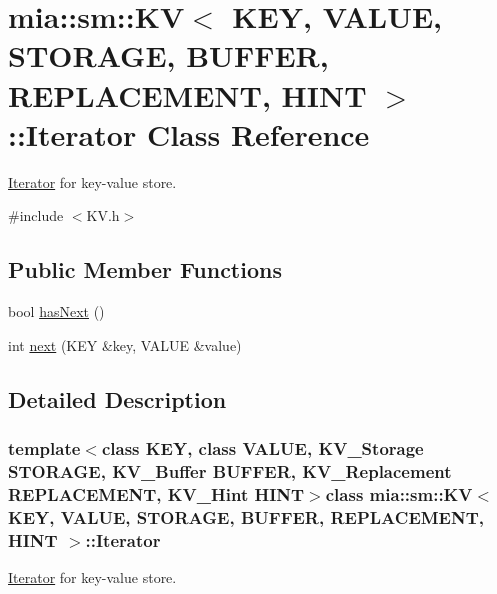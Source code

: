 \hypertarget{classmia_1_1sm_1_1_k_v_1_1_iterator}{\section{mia\-:\-:sm\-:\-:K\-V$<$ K\-E\-Y, V\-A\-L\-U\-E, S\-T\-O\-R\-A\-G\-E, B\-U\-F\-F\-E\-R, R\-E\-P\-L\-A\-C\-E\-M\-E\-N\-T, H\-I\-N\-T $>$\-:\-:Iterator Class Reference}
\label{classmia_1_1sm_1_1_k_v_1_1_iterator}
}


\hyperlink{classmia_1_1sm_1_1_k_v_1_1_iterator}{Iterator} for key-\/value store.  




{\ttfamily \#include $<$K\-V.\-h$>$}

\subsection*{Public Member Functions}
\begin{DoxyCompactItemize}
\item 
bool \hyperlink{classmia_1_1sm_1_1_k_v_1_1_iterator_aadd84a5628619a800298856fc78647c6}{has\-Next} ()
\item 
int \hyperlink{classmia_1_1sm_1_1_k_v_1_1_iterator_a8688cd904ec7f7f5b201470aaf183139}{next} (K\-E\-Y \&key, V\-A\-L\-U\-E \&value)
\end{DoxyCompactItemize}


\subsection{Detailed Description}
\subsubsection*{template$<$class K\-E\-Y, class V\-A\-L\-U\-E, K\-V\-\_\-\-Storage S\-T\-O\-R\-A\-G\-E, K\-V\-\_\-\-Buffer B\-U\-F\-F\-E\-R, K\-V\-\_\-\-Replacement R\-E\-P\-L\-A\-C\-E\-M\-E\-N\-T, K\-V\-\_\-\-Hint H\-I\-N\-T$>$class mia\-::sm\-::\-K\-V$<$ K\-E\-Y, V\-A\-L\-U\-E, S\-T\-O\-R\-A\-G\-E, B\-U\-F\-F\-E\-R, R\-E\-P\-L\-A\-C\-E\-M\-E\-N\-T, H\-I\-N\-T $>$\-::\-Iterator}

\hyperlink{classmia_1_1sm_1_1_k_v_1_1_iterator}{Iterator} for key-\/value store. 

